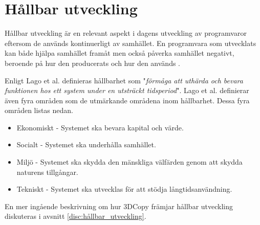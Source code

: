\section{Hållbar utveckling}

Hållbar utveckling är en relevant aspekt i dagens utveckling av programvaror eftersom de används kontinuerligt av samhället. En programvara som utvecklats kan både hjälpa samhället framåt men också påverka samhället negativt, beroende på hur den producerats och hur den används \cite{raturi2014developing}.

Enligt Lago et al. \cite{lago2015framing} definieras hållbarhet som "\textit{förmåga att uthärda och bevara funktionen hos ett system under en utsträckt tidsperiod}". Lago et al. \cite{lago2015framing} definierar även fyra områden som de utmärkande områdena inom hållbarhet. Dessa fyra områden listas nedan.


	\begin{itemize}
		\item Ekonomiskt -  Systemet ska bevara kapital och värde.
		\item Socialt - Systemet ska underhålla samhället.
		\item Miljö - Systemet ska skydda den mänskliga välfärden genom att skydda naturens tillgångar.
		\item Tekniskt - Systemet ska utvecklas för att stödja långtidsanvändning.
	\end{itemize}

En mer ingående beskrivning om hur 3DCopy främjar hållbar utveckling diskuteras i avsnitt \ref{disc:hållbar_utveckling}.


